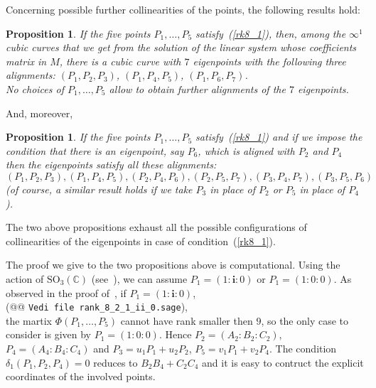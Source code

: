 \documentclass[11pt, a4paper, reqno, captions=tableheading,bibliography=totoc]{scrartcl}
\theoremstyle{plain}
\newtheorem{prop}[lemma]{Proposition}
\theoremstyle{definition}
\newcommand{\iii}{\textbf{i}}
\begin{document}
Concerning possible further collinearities of the points, the following
results hold:
\begin{prop}
\label{three_d_three_alinments}
If the five points $P_1, \dots, P_5$ satisfy~(\ref{rk8_1}),
then, among the $\infty^1$ cubic curves that we get from the
solution of the linear system whose coefficients matrix in $M$, there is 
a cubic curve with $7$ eigenpoints with the following three alignments:
$(P_1, P_2, P_3)$, $(P_1, P_4, P_5)$, $(P_1, P_6, P_7)$. \\
No choices of $P_1, \dots, P_5$ allow to obtain further alignments of the
$7$ eigenpoints.
\end{prop}
And, moreover,
\begin{prop}
\label{prop:d2_6allin}
If the five points $P_1, \dots, P_5$ satisfy~(\ref{rk8_1})
and if we impose the condition that there is an eigenpoint, say $P_6$, 
which is aligned with $P_2$ and $P_4$ then the eigenpoints satisfy all these
alignments:
\[
(P_1, P_2, P_3), (P_1, P_4, P_5), (P_2, P_4, P_6), (P_2, P_5, P_7),
(P_3, P_4, P_7), (P_3, P_5, P_6)
\]
(of course, a similar result holds if we take $P_3$ in place of $P_2$ or $P_5$
in place of $P_4$).
\end{prop}
The two above propositions exhaust all the possible configurations
of collinearities of the eigenpoints in case of condition~(\ref{rk8_1}).

The proof we give to the two propositions above is computational.
Using the action of $\mathrm{SO}_3(\mathbb{C})$ (see~),
we can assume $P_1= (1: \iii: 0)$ or $P_1= (1: 0: 0)$. As observed
in the proof of~, if $P_1 = (1: \iii: 0)$,\\
(@@ \verb+Vedi file rank_8_2_1_ii_0.sage+), \\
the martix
$\Phi(P_1, \dots, P_5)$ cannot have rank smaller then $9$, so the only
case to consider is given by $P_1 = (1: 0: 0)$. Hence
$P_2 = (A_2: B_2: C_2)$, $P_4 = (A_4: B_4: C_4)$ and
$P_3 = u_1P_1+u_2P_2$, $P_5=v_1P_1+v_2P_4$.
The condition $\delta_1(P_1, P_2, P_4)=0$ reduces to $B_2B_4+C_2C_4$
and it is easy to contruct the explicit coordinates of the involved points.
\end{document}
